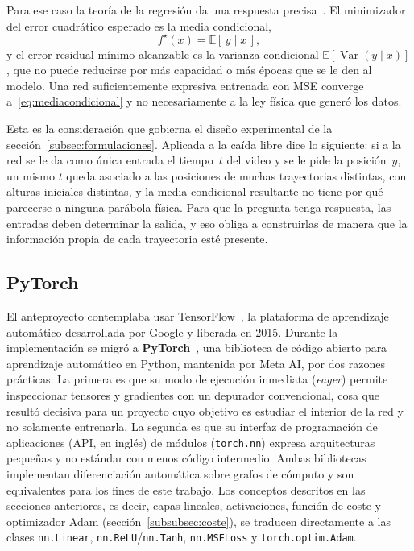\documentclass[titlepage,11pt]{article}
\begin{document}
Para ese caso la teoría de la regresión da una respuesta
precisa~\cite{hastie_2009_elements}. El minimizador
del error cuadrático esperado es la media condicional,
\begin{equation}
  f^{\star}(x)=\mathbb{E}[\,y\mid x\,],
  \label{eq:mediacondicional}
\end{equation}
y el error residual mínimo alcanzable es la varianza condicional
$\mathbb{E}[\operatorname{Var}(y\mid x)]$, que no puede reducirse por más
capacidad o más épocas que se le den al modelo. Una red suficientemente
expresiva entrenada con MSE converge a~\eqref{eq:mediacondicional} y no
necesariamente a la ley física que generó los datos.

Esta es la consideración que gobierna el diseño experimental de la
sección~\ref{subsec:formulaciones}. Aplicada a la caída libre dice lo
siguiente: si a la red se le da como única entrada el tiempo~$t$ del video y se
le pide la posición~$y$, un mismo $t$ queda asociado a las posiciones de muchas
trayectorias distintas, con alturas iniciales distintas, y la media condicional
resultante no tiene por qué parecerse a ninguna parábola física. Para que la
pregunta tenga respuesta, las entradas deben determinar la salida, y eso obliga
a construirlas de manera que la información propia de cada trayectoria esté
presente.

\subsection{PyTorch}
\label{subsec:ts}
El anteproyecto contemplaba usar TensorFlow~\cite{TensorFlow}, la plataforma de
aprendizaje automático desarrollada por Google y liberada en 2015. Durante la
implementación se migró a \textbf{PyTorch}~\cite{paszke_2019_pytorch}, una biblioteca de
código abierto para aprendizaje automático en Python,
mantenida por Meta AI, por dos razones prácticas. La primera es que su modo de
ejecución inmediata (\emph{eager}) permite inspeccionar tensores y gradientes
con un depurador convencional, cosa que resultó decisiva para un proyecto cuyo
objetivo es estudiar el interior de la red y no solamente entrenarla. La
segunda es que su interfaz de programación de aplicaciones (API, en inglés) de módulos (\texttt{torch.nn}) expresa arquitecturas
pequeñas y no estándar con menos código intermedio. Ambas bibliotecas
implementan diferenciación automática sobre grafos de cómputo y son
equivalentes para los fines de este trabajo. Los conceptos descritos en las
secciones anteriores, es decir, capas lineales, activaciones, función de coste
y optimizador Adam (sección~\ref{subsubsec:coste}), se traducen directamente a las clases \texttt{nn.Linear},
\texttt{nn.ReLU}/\texttt{nn.Tanh}, \texttt{nn.MSELoss} y
\texttt{torch.optim.Adam}.
\end{document}
